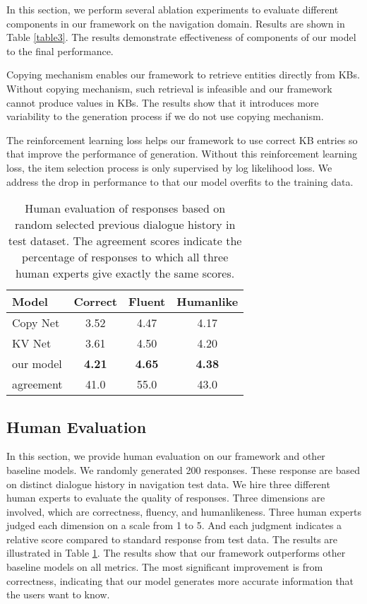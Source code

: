 \documentclass[11pt]{article}
\begin{document}
In this section, we perform several ablation experiments to evaluate different components in our framework on the navigation domain. Results are shown in Table \ref{table3}. The results demonstrate effectiveness of components of our model to the final performance. 

Copying mechanism enables our framework to retrieve entities directly from KBs. Without copying mechanism, such retrieval is infeasible and our framework cannot produce values in KBs. The results show that it introduces more variability to the generation process if we do not use copying mechanism.

The reinforcement learning loss helps our framework to use correct KB entries so that improve the performance of generation. Without this reinforcement learning loss, the item selection process is only supervised by log likelihood loss. We address the drop in performance to that our model overfits to the training data.

\begin{table}[!tp]
	\centering
		\begin{tabular}{l|ccc}
	\textbf{Model}&\textbf{Correct}&\textbf{Fluent}&\textbf{Humanlike}\\\hline
	Copy Net &3.52&4.47&4.17\\
	KV Net&3.61&4.50&4.20\\
	our model&\textbf{4.21}&\textbf{4.65}&\textbf{4.38}\\\hline
	agreement&41.0&55.0&43.0
\end{tabular}
\caption{Human evaluation of responses based on random selected previous dialogue history in test dataset. The agreement scores indicate the percentage of responses to which all three human experts give exactly the same scores.}
\label{table4}
\end{table}

\subsection{Human Evaluation}
In this section, we provide human evaluation on our framework and other baseline models. We randomly generated 200 responses. These response are based on distinct dialogue history in navigation test data. We hire three different human experts to evaluate the quality of responses. Three dimensions are involved, which are correctness, fluency, and humanlikeness. Three human experts judged each dimension on a scale from 1 to 5. And each judgment indicates a relative score compared to standard response from test data. The results are illustrated in Table \ref{table4}. The results show that our framework outperforms other baseline models on all metrics. The most significant improvement is from correctness, indicating that our model generates more accurate information that the users want to know.
\end{document}
